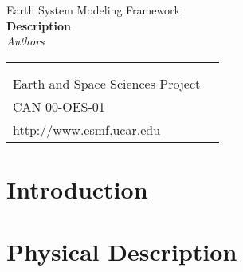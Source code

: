 \documentclass[]{article}
\begin{document}

\begin{titlepage}

\begin{center}
{\Large Earth System Modeling Framework } \\
\vspace{.25in}
{\Large {\bf <Module, Library, Component or Model Name> Description}} \\
\vspace{.25in}
{\large {\it Authors}}
\vspace{.5in}
\end{center}

\begin{latexonly}
\vspace{5.5in}
\begin{tabular}{p{5in}p{.9in}}
\hrulefill \\
\noindent {\bf NASA High Performance Computing and Communications Program} \\
\noindent Earth and Space Sciences Project \\
\noindent CAN 00-OES-01 \\
\noindent http://www.esmf.ucar.edu \\
\end{tabular}
\end{latexonly}

\end{titlepage}

\tableofcontents

\newpage
\section{Introduction}

\section{Physical Description}

 

\end{document}
